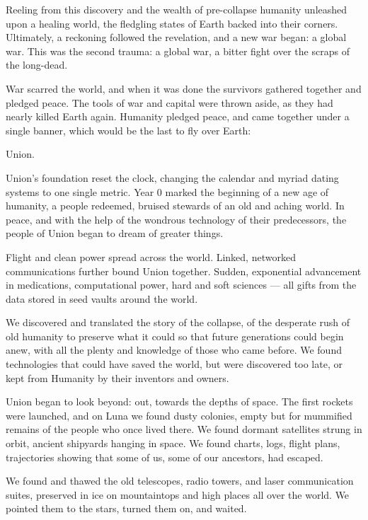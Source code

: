 Reeling from this discovery and the wealth of pre-collapse humanity unleashed upon a healing  
world, the fledgling states of Earth backed into their corners. Ultimately, a reckoning followed the  
revelation, and a new war began: a global war. This was the second trauma: a global war, a bitter  
fight over the scraps of the long-dead. 
 

War scarred the world, and when it was done the survivors gathered together and pledged  
peace. The tools of war and capital were thrown aside, as they had nearly killed Earth again.  
Humanity pledged peace, and came together under a single banner, which would be the last to  
fly over Earth: 
 

Union. 
 

Union’s foundation reset the clock, changing the calendar and myriad dating systems to one  
single metric. Year 0 marked the beginning of a new age of humanity, a people redeemed,  
bruised stewards of an old and aching world. In peace, and with the help of the wondrous  
technology of their predecessors, the people of Union began to dream of greater things.
 

                                                                                                           


Flight and clean power spread across the world. Linked, networked communications further  
bound Union together. Sudden, exponential advancement in medications, computational power,  
hard and soft sciences — all gifts from the data stored in seed vaults around the world. 
 

We discovered and translated the story of the collapse, of the desperate rush of old humanity to  
preserve what it could so that future generations could begin anew, with all the plenty and  
knowledge of those who came before. We found technologies that could have saved the world,  
but were discovered too late, or kept from Humanity by their inventors and owners. 
 

Union began to look beyond: out, towards the depths of space. The first rockets were launched,  
and on Luna we found dusty colonies, empty but for mummified remains of the people who once  
lived there. We found dormant satellites strung in orbit, ancient shipyards hanging in space. We  
found charts, logs, flight plans, trajectories showing that some of us, some of our ancestors, had  
escaped. 
 

We found and thawed the old telescopes, radio towers, and laser communication suites,  
preserved in ice on mountaintops and high places all over the world. We pointed them to the  
stars, turned them on, and waited.  
 

